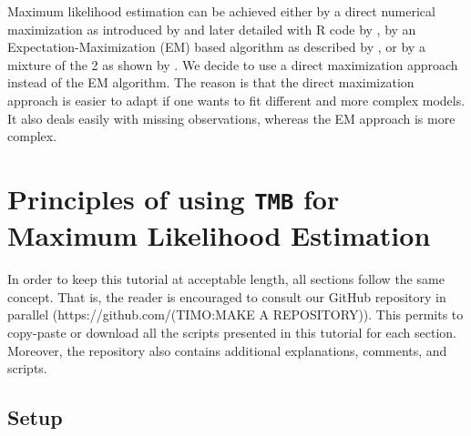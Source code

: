 \documentclass[bimj,fleqn]{w-art}\usepackage[]{graphicx}\usepackage[]{color}
\theoremstyle{plain}
\theoremstyle{definition}
\begin{document}
Maximum likelihood estimation can be achieved either by a direct numerical maximization as introduced by \citet{turner} and later detailed with R code by \citet{zucchini}, by an Expectation-Maximization (EM) based algorithm as described by \citet{bauma}, or by a mixture of the 2 as shown by \citet{bulla}.
We decide to use a direct maximization approach instead of the EM algorithm.
The reason is that the direct maximization approach is easier to adapt if one wants to fit different and more complex models.
It also deals easily with missing observations, whereas the EM approach is more complex.

% 



\section{Principles of using {\tt{TMB}} for Maximum Likelihood Estimation}
\label{sec:principles}


In order to keep this tutorial at acceptable length, all sections follow the same concept.
That is, the reader is encouraged to consult our GitHub repository in parallel (https://github.com/(TIMO:MAKE A REPOSITORY)).
This permits to copy-paste or download all the scripts presented in this tutorial for each section.
Moreover, the repository also contains additional explanations, comments, and scripts.

\subsection{Setup}
\label{sec:setup}
\end{document}

